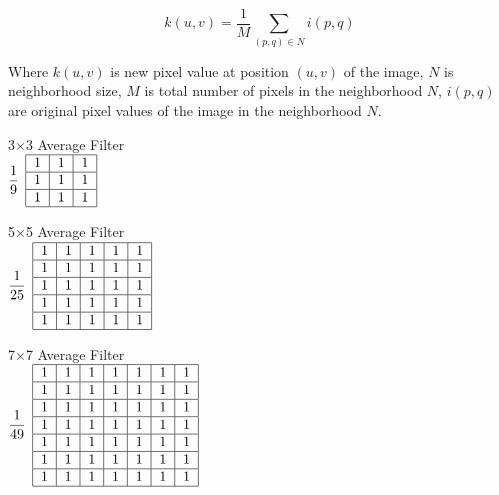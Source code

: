 \begin{equation}
k(u,v) = \frac{1}{M} \sum_{(p,q) \in N} i(p,q)
\end{equation}

Where $k(u,v)$ is new pixel value at position $(u,v)$ of the image, $N$ is neighborhood size, $M$ is total number of pixels in the neighborhood $N$, $i(p,q)$ are original pixel values of the image in the neighborhood $N$. 

\begin{table}[tb]
	\caption{Example of Average Filter} 
	\label{tab:average_filter}

	\begin{center}
		3$\times$3 Average Filter \\
		$\dfrac{1}{9}\hspace{0.5em}\begin{tabular}{|c|c|c|}
		\hline 
		1 & 1 & 1 \\ 
		\hline 
		1 & 1 & 1 \\ 
		\hline 
		1 & 1 & 1 \\ 
		\hline 
		\end{tabular}$ 	
	\end{center}

	\begin{center}
		5$\times$5 Average Filter \\
		$\dfrac{1}{25}\hspace{0.5em}\begin{tabular}{|c|c|c|c|c|}
		\hline 
		1 & 1 & 1 & 1 & 1 \\ 
		\hline 
		1 & 1 & 1 & 1 & 1 \\ 
		\hline 
		1 & 1 & 1 & 1 & 1 \\ 
		\hline 
		1 & 1 & 1 & 1 & 1 \\ 
		\hline 
		1 & 1 & 1 & 1 & 1 \\ 
		\hline 
		\end{tabular} $
	\end{center}

	\begin{center}
		7$\times$7 Average Filter \\
		$\dfrac{1}{49}\hspace{0.5em}\begin{tabular}{|c|c|c|c|c|c|c|}
		\hline 
		1 & 1 & 1 & 1 & 1 & 1 & 1 \\ 
		\hline 
		1 & 1 & 1 & 1 & 1 & 1 & 1 \\ 
		\hline 
		1 & 1 & 1 & 1 & 1 & 1 & 1 \\ 
		\hline 
		1 & 1 & 1 & 1 & 1 & 1 & 1 \\ 
		\hline 
		1 & 1 & 1 & 1 & 1 & 1 & 1 \\ 
		\hline 
		1 & 1 & 1 & 1 & 1 & 1 & 1 \\ 
		\hline 
		1 & 1 & 1 & 1 & 1 & 1 & 1 \\ 
		\hline 
	\end{tabular} $
	\end{center}

\end{table}

